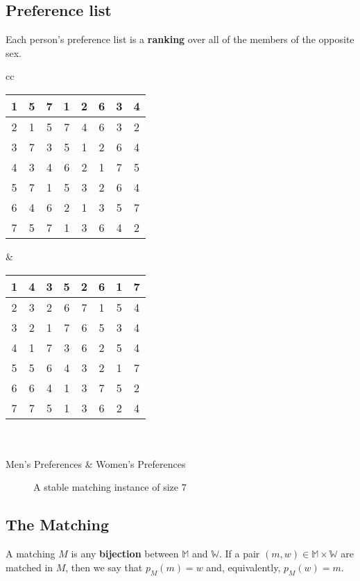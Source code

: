 \subsection{Preference list}
Each person's preference list is a \textbf{ranking} over all of the members of the opposite sex.
\begin{center}
\begin{tabular}{ cc }   %
\begin{tabular}{ |c||c|c|c|c|c|c|c| } 
\hline
1 & 5 & 7 & 1 & 2 & 6 & 3 & 4 \\
\hline
2 & 1 & 5 & 7 & 4 & 6 & 3 & 2 \\
\hline
3 & 7 & 3 & 5 & 1 & 2 & 6 & 4 \\
\hline
4 & 3 & 4 & 6 & 2 & 1 & 7 & 5 \\
\hline
5 & 7 & 1 & 5 & 3 & 2 & 6 & 4 \\
\hline
6 & 4 & 6 & 2 & 1 & 3 & 5 & 7 \\
\hline
7 & 5 & 7 & 1 & 3 & 6 & 4 & 2 \\
\hline
\end{tabular} &  %
\begin{tabular}{ |c||c|c|c|c|c|c|c| } 
\hline
1 & 4 & 3 & 5 & 2 & 6 & 1 & 7 \\
\hline
2 & 3 & 2 & 6 & 7 & 1 & 5 & 4 \\
\hline
3 & 2 & 1 & 7 & 6 & 5 & 3 & 4 \\
\hline
4 & 1 & 7 & 3 & 6 & 2 & 5 & 4 \\
\hline
5 & 5 & 6 & 4 & 3 & 2 & 1 & 7 \\
\hline
6 & 6 & 4 & 1 & 3 & 7 & 5 & 2 \\
\hline
7 & 7 & 5 & 1 & 3 & 6 & 2 & 4 \\
\hline
\end{tabular} \\ \\
Men's Preferences & Women's Preferences \\ 
\end{tabular}
\begin{figure}[ht]
  \caption{A stable matching instance of size $7$}
  \label{FIG_1_5}
\end{figure}
\end{center}

\subsection{The Matching}
    A matching ${M}$ is any \textbf{bijection} between $\mathbb{M}$ and $\mathbb{W}$. If a pair $(m,w) \in \mathbb{M} \times \mathbb{W}$ are matched in $M$, then we say that $p_M(m) = w$ and, equivalently, $p_M(w) = m$.
 

